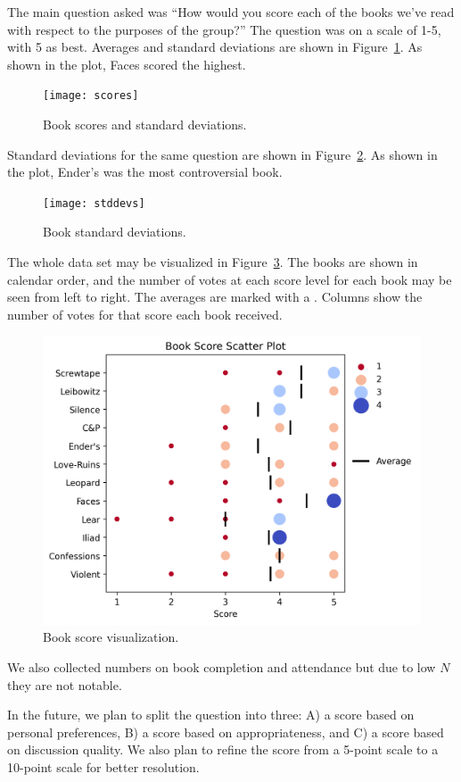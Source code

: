 \documentclass{article}
\newcommand{\PLOT}[1]{Figure~\ref{plot:#1}}
\begin{document}
The main question asked was ``How would you score each of the books we've read with respect to the purposes of the group?''  The question was on a scale of 1-5, with 5 as best.  Averages and standard deviations are shown in \PLOT{scores}.  As shown in the plot, Faces scored the highest.

\newcommand{\plotwidth}{0.9}

\begin{figure}
\texttt{[image: scores]}
\caption{Book scores and standard deviations.
  \label{plot:scores}}
\end{figure}

Standard deviations for the same question are shown in \PLOT{stddevs}.  As shown in the plot, Ender's was the most controversial book.

\begin{figure}
\texttt{[image: stddevs]}
\caption{Book standard deviations.
  \label{plot:stddevs}}
\end{figure}

The whole data set may be visualized in \PLOT{viz}.  The books are shown in calendar order, and the number of votes at each score level for each book may be seen from left to right.  The averages are marked with a \pmb{\textbar}.  Columns show the number of votes for that score each book received.

\begin{figure}
\includegraphics[width=\plotwidth\columnwidth]{viz}
\caption{Book score visualization.
  \label{plot:viz}}
\end{figure}

We also collected numbers on book completion and attendance but due to low $N$ they are not notable.

In the future, we plan to split the question into three: A) a score based on personal preferences, B) a score based on appropriateness, and C) a score based on discussion quality.  We also plan to refine the score from a 5-point scale to a 10-point scale for better resolution.
\end{document}
